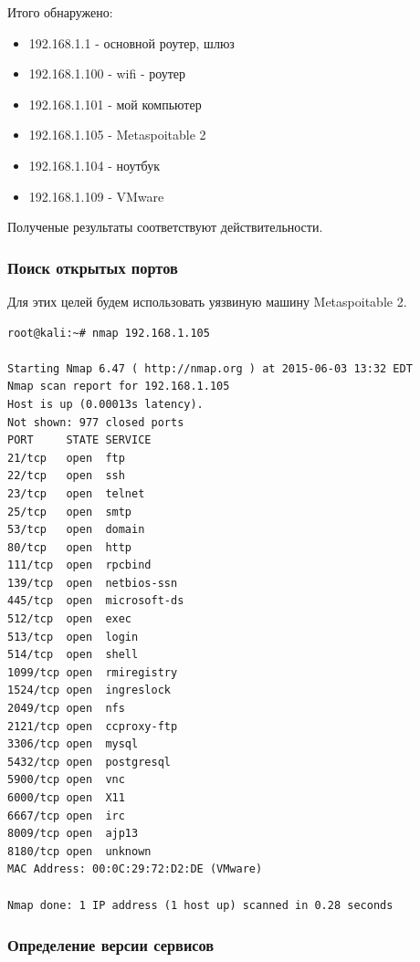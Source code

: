 \documentclass[10pt,a4paper]{article}
\begin{document}
Итого обнаружено:  

\begin{itemize}
\item 192.168.1.1 - основной роутер, шлюз
\item 192.168.1.100 - wifi - роутер
\item 192.168.1.101 - мой компьютер
\item 192.168.1.105 - Metaspoitable 2
\item 192.168.1.104 - ноутбук
\item 192.168.1.109 - VMware
\end{itemize}

Полученые результаты соответствуют действительности.

\subsubsection{Поиск открытых портов}

Для этих целей будем использовать уязвиную машину Metaspoitable 2.

\begin{verbatim}
root@kali:~# nmap 192.168.1.105

Starting Nmap 6.47 ( http://nmap.org ) at 2015-06-03 13:32 EDT
Nmap scan report for 192.168.1.105
Host is up (0.00013s latency).
Not shown: 977 closed ports
PORT     STATE SERVICE
21/tcp   open  ftp
22/tcp   open  ssh
23/tcp   open  telnet
25/tcp   open  smtp
53/tcp   open  domain
80/tcp   open  http
111/tcp  open  rpcbind
139/tcp  open  netbios-ssn
445/tcp  open  microsoft-ds
512/tcp  open  exec
513/tcp  open  login
514/tcp  open  shell
1099/tcp open  rmiregistry
1524/tcp open  ingreslock
2049/tcp open  nfs
2121/tcp open  ccproxy-ftp
3306/tcp open  mysql
5432/tcp open  postgresql
5900/tcp open  vnc
6000/tcp open  X11
6667/tcp open  irc
8009/tcp open  ajp13
8180/tcp open  unknown
MAC Address: 00:0C:29:72:D2:DE (VMware)

Nmap done: 1 IP address (1 host up) scanned in 0.28 seconds

\end{verbatim}

\subsubsection{Определение версии сервисов}
\end{document}
